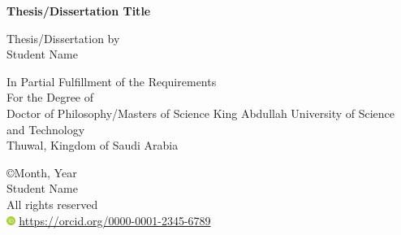 \documentclass[onecolumn, 12 pt, doublespace, fullpage, a4paper]{report}
\newcommand{\orcid}{\includegraphics[width=8pt]{0.asset/ORCID}} %
\begin{document}

\thispagestyle{empty}
\addvspace{5mm}  %


\begin{center}
	\begin{doublespace}
		{\textbf{{\large Thesis/Dissertation Title}}}%
	\end{doublespace}

	\vspace{10mm}
	{Thesis/Dissertation by}\\
	{Student Name} %

	\vspace{30mm}

	{ In Partial Fulfillment of the Requirements}\\[12pt]
	{ For the Degree of}\\[12pt]
	{Doctor of Philosophy/Masters of Science} \vfill
	{King Abdullah University of Science and Technology }\\
	{Thuwal, Kingdom of Saudi Arabia}
	\vfill

	\begin{onehalfspace}
		{\copyright Month, Year}\\
		Student Name\\               %
		All rights reserved\\

		\orcid{} \small \href{https://orcid.org/0000-0001-2345-6789}{https://orcid.org/0000-0001-2345-6789}\\
	\end{onehalfspace}

\end{center}

\newpage


%
\chaptertitlefont{\fontsize{14}{15}\selectfont\centering}
\end{document}
